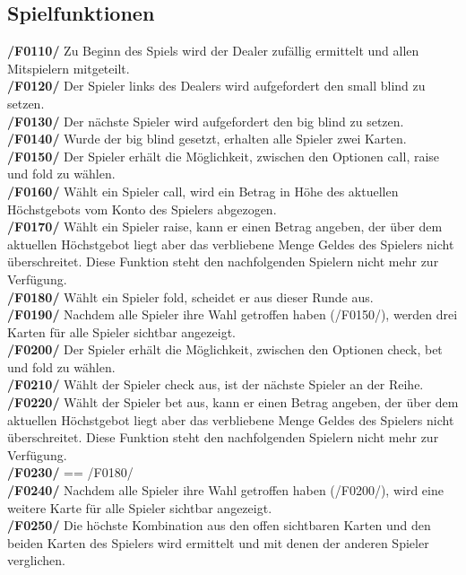 \documentclass[a4paper,12pt,bibtotoc, parskip=full]{article}
\begin{document}
\subsection{Spielfunktionen}
\textbf{/F0110/} Zu Beginn des Spiels wird der Dealer zufällig ermittelt und allen Mitspielern mitgeteilt.\\
\textbf{/F0120/} Der Spieler links des Dealers wird aufgefordert den small blind zu setzen.\\
\textbf{/F0130/} Der nächste Spieler wird aufgefordert den big blind zu setzen.\\
\textbf{/F0140/} Wurde der big blind gesetzt, erhalten alle Spieler zwei Karten.\\
\textbf{/F0150/} Der Spieler erhält die Möglichkeit, zwischen den Optionen call, raise und fold zu wählen.\\
\textbf{/F0160/} Wählt ein Spieler call, wird ein Betrag in Höhe des aktuellen Höchstgebots vom Konto des Spielers abgezogen.\\
\textbf{/F0170/} Wählt ein Spieler raise, kann er einen Betrag angeben, der über dem aktuellen Höchstgebot liegt aber das verbliebene Menge Geldes des Spielers nicht überschreitet. Diese Funktion steht den nachfolgenden Spielern nicht mehr zur Verfügung.\\
\textbf{/F0180/} Wählt ein Spieler fold, scheidet er aus dieser Runde aus.\\
\textbf{/F0190/} Nachdem alle Spieler ihre Wahl getroffen haben (/F0150/), werden drei Karten für alle Spieler sichtbar angezeigt.\\
\textbf{/F0200/} Der Spieler erhält die Möglichkeit, zwischen den Optionen check, bet und fold zu wählen.\\
\textbf{/F0210/} Wählt der Spieler check aus, ist der nächste Spieler an der Reihe.\\
\textbf{/F0220/} Wählt der Spieler bet aus, kann er einen Betrag angeben, der über dem aktuellen Höchstgebot liegt aber das verbliebene Menge Geldes des Spielers nicht überschreitet. Diese Funktion steht den nachfolgenden Spielern nicht mehr zur Verfügung.\\
\textbf{/F0230/} == /F0180/\\
\textbf{/F0240/} Nachdem alle Spieler ihre Wahl getroffen haben (/F0200/), wird eine weitere Karte für alle Spieler sichtbar angezeigt.\\
\textbf{/F0250/} Die höchste Kombination aus den offen sichtbaren Karten und den beiden Karten des Spielers wird ermittelt und mit denen der anderen Spieler verglichen.\\
\end{document}

